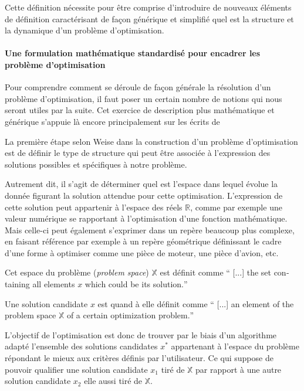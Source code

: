 Cette définition nécessite pour être comprise d'introduire de nouveaux éléments de définition caractérisant de façon générique et simplifié quel est la structure et la dynamique d'un problème d'optimisation.

\paragraph{Une formulation mathématique standardisé pour encadrer les problème d'optimisation}


Pour comprendre comment se déroule de façon générale la résolution d'un problème d'optimisation, il faut poser un certain nombre de notions qui nous seront utiles par la suite. Cet exercice de description plus mathématique et générique s'appuie là encore principalement sur les écrits de \textcite{Weise2011}

La première étape selon Weise dans la construction d'un problème d'optimisation est de définir le type de structure qui peut être associée à l'expression des solutions possibles et spécifiques à notre problème.

Autrement dit, il s'agit de déterminer quel est l'espace dans lequel évolue la donnée figurant la solution attendue pour cette optimisation. L'expression de cette solution peut appartenir à l'espace des réels $\mathbb{R}$, comme par exemple une valeur numérique se rapportant à l'optimisation d'une fonction mathématique. Mais celle-ci peut également s'exprimer dans un repère beaucoup plus complexe, en faisant référence par exemple à un repère géométrique définissant le cadre  d'une forme à optimiser comme une pièce de moteur, une pièce d'avion, etc. \autocite[43]{Weise2011}

Cet espace du problème (\textit{problem space}) $\mathbb{X}$ est définit comme \foreignquote{english}{ [...] the set containing all elements $x$ which could be its solution.} 

Une solution candidate $x$ est quand à elle définit comme \foreignquote{english}{ [...] an element of the problem space $ \mathbb{X}$ of a certain optimization problem.}

L'objectif de l'optimisation est donc de trouver par le biais d'un algorithme adapté l'ensemble des solutions candidates $x^*$ appartenant à l'espace du problème répondant le mieux aux critères définis par l'utilisateur. Ce qui suppose de pouvoir qualifier une solution candidate $x_1$ tiré de $\mathbb{X}$ par rapport à une autre solution candidate $x_2$ elle aussi tiré de $\mathbb{X}$.

